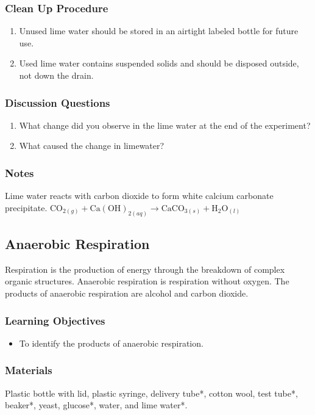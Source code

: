\subsubsection*{Clean Up Procedure}
\begin{enumerate}
\item{Unused lime water should be stored in an airtight labeled bottle for future use.}
\item{Used lime water contains suspended solids and should be disposed outside, not down the drain.}
\end{enumerate}

\subsubsection*{Discussion Questions}
\begin{enumerate}
\item{What change did you observe in the lime water at the end of the experiment?}
\item{What caused the change in limewater?}
\end{enumerate}

\subsubsection*{Notes}
Lime water reacts with carbon dioxide to form white calcium carbonate precipitate.
$\mathrm{CO}_{2(g)} + \mathrm{Ca(OH)}_{2(aq)} \longrightarrow \mathrm{CaCO}_{3(s)} + \mathrm{H}_2\mathrm{O}_{(l)}$

\subsection{Anaerobic Respiration}

Respiration is the production of energy through the breakdown of complex organic structures. Anaerobic respiration is respiration without oxygen. The products of anaerobic respiration are alcohol and carbon dioxide.

\subsubsection*{Learning Objectives}
\begin{itemize}
\item{To identify the products of anaerobic respiration.}
\end{itemize}

\subsubsection*{Materials}
Plastic bottle with lid, plastic syringe, delivery tube*, cotton wool, test tube*, beaker*, yeast, glucose*, water, and lime water*.

